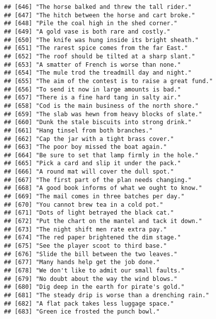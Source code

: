 \documentclass[
]{article}
\begin{document}
\begin{verbatim}
## [646] "The horse balked and threw the tall rider."               
## [647] "The hitch between the horse and cart broke."              
## [648] "Pile the coal high in the shed corner."                   
## [649] "A gold vase is both rare and costly."                     
## [650] "The knife was hung inside its bright sheath."             
## [651] "The rarest spice comes from the far East."                
## [652] "The roof should be tilted at a sharp slant."              
## [653] "A smatter of French is worse than none."                  
## [654] "The mule trod the treadmill day and night."               
## [655] "The aim of the contest is to raise a great fund."         
## [656] "To send it now in large amounts is bad."                  
## [657] "There is a fine hard tang in salty air."                  
## [658] "Cod is the main business of the north shore."             
## [659] "The slab was hewn from heavy blocks of slate."            
## [660] "Dunk the stale biscuits into strong drink."               
## [661] "Hang tinsel from both branches."                          
## [662] "Cap the jar with a tight brass cover."                    
## [663] "The poor boy missed the boat again."                      
## [664] "Be sure to set that lamp firmly in the hole."             
## [665] "Pick a card and slip it under the pack."                  
## [666] "A round mat will cover the dull spot."                    
## [667] "The first part of the plan needs changing."               
## [668] "A good book informs of what we ought to know."            
## [669] "The mail comes in three batches per day."                 
## [670] "You cannot brew tea in a cold pot."                       
## [671] "Dots of light betrayed the black cat."                    
## [672] "Put the chart on the mantel and tack it down."            
## [673] "The night shift men rate extra pay."                      
## [674] "The red paper brightened the dim stage."                  
## [675] "See the player scoot to third base."                      
## [676] "Slide the bill between the two leaves."                   
## [677] "Many hands help get the job done."                        
## [678] "We don't like to admit our small faults."                 
## [679] "No doubt about the way the wind blows."                   
## [680] "Dig deep in the earth for pirate's gold."                 
## [681] "The steady drip is worse than a drenching rain."          
## [682] "A flat pack takes less luggage space."                    
## [683] "Green ice frosted the punch bowl."                        

\end{verbatim}
\end{document}
